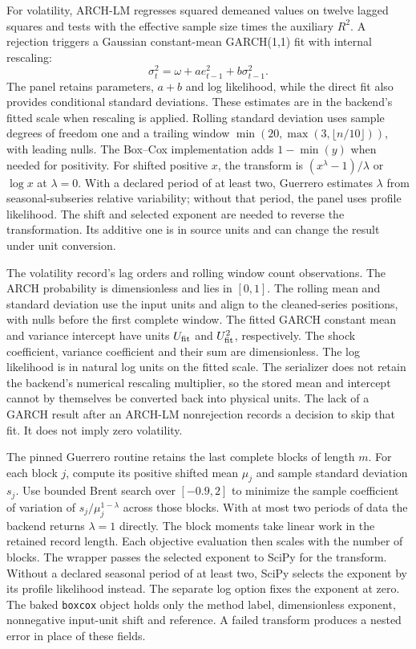 For volatility, ARCH-LM regresses squared demeaned values on twelve lagged squares and tests with the effective sample size times the auxiliary $R^2$. A rejection triggers a Gaussian constant-mean GARCH(1,1) fit with internal rescaling:
\begin{equation}
 \sigma_t^2=\omega+a e_{t-1}^2+b\sigma_{t-1}^2 .
\end{equation}
The panel retains parameters, $a+b$ and log likelihood, while the direct fit also provides conditional standard deviations. These estimates are in the backend's fitted scale when rescaling is applied. Rolling standard deviation uses sample degrees of freedom one and a trailing window $\min(20,\max(3,\lfloor n/10\rfloor))$, with leading nulls. The Box--Cox implementation adds $1-\min(y)$ when needed for positivity. For shifted positive $x$, the transform is $(x^\lambda-1)/\lambda$ or $\log x$ at $\lambda=0$. With a declared period of at least two, Guerrero estimates $\lambda$ from seasonal-subseries relative variability; without that period, the panel uses profile likelihood. The shift and selected exponent are needed to reverse the transformation. Its additive one is in source units and can change the result under unit conversion.

The volatility record's lag orders and rolling window count observations. The ARCH probability is dimensionless and lies in $[0,1]$. The rolling mean and standard deviation use the input units and align to the cleaned-series positions, with nulls before the first complete window. The fitted GARCH constant mean and variance intercept have units $U_{\rm fit}$ and $U_{\rm fit}^{2}$, respectively. The shock coefficient, variance coefficient and their sum are dimensionless. The log likelihood is in natural log units on the fitted scale. The serializer does not retain the backend's numerical rescaling multiplier, so the stored mean and intercept cannot by themselves be converted back into physical units. The lack of a GARCH result after an ARCH-LM nonrejection records a decision to skip that fit. It does not imply zero volatility.

The pinned Guerrero routine retains the last complete blocks of length
$m$. For each block $j$, compute its positive shifted mean $\mu_j$
and sample standard deviation $s_j$. Use bounded Brent search over
$[-0.9,2]$ to minimize the sample coefficient of variation of
$s_j/\mu_j^{1-\lambda}$ across those blocks. With at most two periods
of data the backend returns $\lambda=1$ directly. The block moments
take linear work in the retained record length. Each objective
evaluation then scales with the number of blocks. The wrapper passes
the selected exponent to SciPy for the transform. Without a declared
seasonal period of at least two, SciPy selects the exponent by its
profile likelihood instead. The separate log option fixes the exponent
at zero. The baked \texttt{boxcox} object holds only the method label,
dimensionless exponent, nonnegative input-unit shift and reference.
A failed transform produces a nested error in place of these fields.


